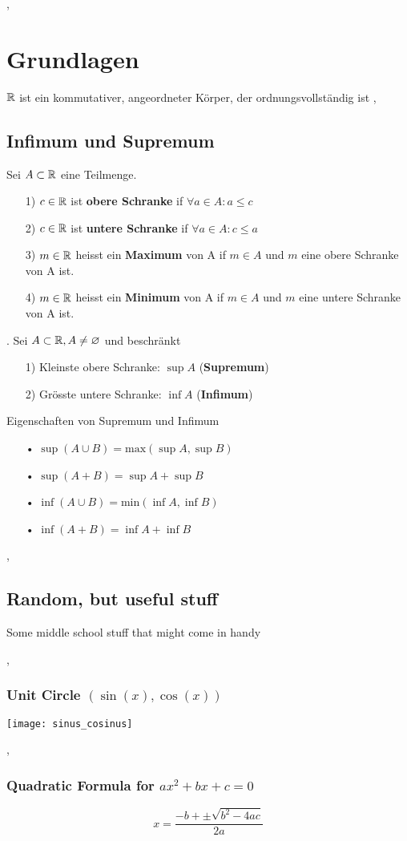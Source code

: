 \sep
\section{Grundlagen}
\Satz[1.1.2]  $\mathbb{R}$ ist ein kommutativer, angeordneter Körper, der ordnungsvollständig ist
\sep

\subsection{Infimum und Supremum}
\Def[1.1.12]  Sei $A \subset \mathbb{R}$ eine Teilmenge.
\begin{enumerate}
\item[1)]  $c \in \mathbb{R}$ ist \textbf{obere Schranke} if  $\forall a \in A: a \leqslant c$
\item[2)]  $c \in \mathbb{R}$ ist \textbf{untere Schranke} if $\forall a \in A: c \leqslant a$
\item[3)] $m \in \mathbb{R}$ heisst ein \textbf{Maximum} von A if $m \in A$ und $m$ eine obere Schranke von A ist.
\item[4)] $m \in \mathbb{R}$ heisst ein \textbf{Minimum} von A if $m \in A$ und $m$ eine untere Schranke von A ist.
\end{enumerate}

\Satz[1.1.15]. Sei $A \subset \mathbb{R}, A \neq \varnothing$ und beschränkt
\begin{enumerate}
\item[1)]  Kleinste obere Schranke: $\sup A$ (\textbf{Supremum})
\item[2)]  Grösste untere Schranke: $\inf A $ (\textbf{Infimum})
\end{enumerate}

Eigenschaften von Supremum und Infimum
\begin{enumerate}
\item[•]  $\sup (A \cup B) = \text{max} (\sup A, \sup B)$
\item[•]  $\sup (A + B) = \sup A + \sup B$
\item[•]  $\inf (A \cup B) = \text{min} (\inf A, \inf B)$
\item[•]  $\inf (A + B) = \inf A + \inf B$
\end{enumerate}

\sep

\subsection{Random, but useful stuff}
Some middle school stuff that might come in handy

\sep

\subsubsection{Unit Circle $(\sin(x), \cos(x))$}
\texttt{[image: sinus\_cosinus]}

\sep

\subsubsection{Quadratic Formula for $a x^2 + b x + c = 0$}

\[ x = \frac{-b + \pm \sqrt{b^2 - 4 a c} }{2 a} \]